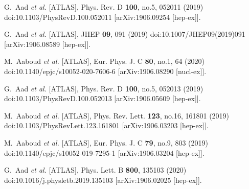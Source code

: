 \begin{thebibliography}{9}
G.~Aad \textit{et al.} [ATLAS],
Phys. Rev. D \textbf{100}, no.5, 052011 (2019)
doi:10.1103/PhysRevD.100.052011
[arXiv:1906.09254 [hep-ex]].

G.~Aad \textit{et al.} [ATLAS],
JHEP \textbf{09}, 091 (2019)
doi:10.1007/JHEP09(2019)091
[arXiv:1906.08589 [hep-ex]].

M.~Aaboud \textit{et al.} [ATLAS],
Eur. Phys. J. C \textbf{80}, no.1, 64 (2020)
doi:10.1140/epjc/s10052-020-7606-6
[arXiv:1906.08290 [nucl-ex]].

G.~Aad \textit{et al.} [ATLAS],
Phys. Rev. D \textbf{100}, no.5, 052013 (2019)
doi:10.1103/PhysRevD.100.052013
[arXiv:1906.05609 [hep-ex]].

M.~Aaboud \textit{et al.} [ATLAS],
Phys. Rev. Lett. \textbf{123}, no.16, 161801 (2019)
doi:10.1103/PhysRevLett.123.161801
[arXiv:1906.03203 [hep-ex]].

M.~Aaboud \textit{et al.} [ATLAS],
Eur. Phys. J. C \textbf{79}, no.9, 803 (2019)
doi:10.1140/epjc/s10052-019-7295-1
[arXiv:1906.03204 [hep-ex]].

G.~Aad \textit{et al.} [ATLAS],
Phys. Lett. B \textbf{800}, 135103 (2020)
doi:10.1016/j.physletb.2019.135103
[arXiv:1906.02025 [hep-ex]].


\end{thebibliography}
